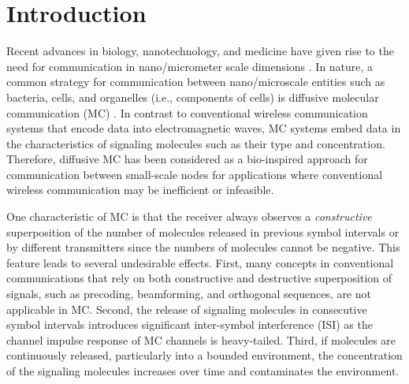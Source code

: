 \documentclass[conference]{IEEEtran}
\begin{document}



\section{Introduction}
Recent advances in biology, nanotechnology, and medicine have given rise to the need for communication in nano/micrometer scale dimensions \cite{Nariman_Survey}. In nature,  a common strategy for communication between nano/microscale entities such as bacteria, cells, and organelles (i.e., components of
cells) is diffusive molecular communication (MC) \cite{CellBio}. In contrast to conventional wireless communication systems that encode data into electromagnetic
waves, MC systems embed data in the characteristics of  signaling molecules such as their type and concentration. Therefore,
diffusive MC has been considered as a bio-inspired approach for communication between small-scale
nodes for applications where conventional wireless communication may be inefficient or infeasible.

One characteristic of MC is that the receiver always observes a \textit{constructive} superposition of the number of molecules  released in previous symbol intervals or by different transmitters since the numbers of molecules cannot be negative. This feature leads to  several undesirable effects. First, many concepts in conventional communications that rely on both constructive and destructive superposition of signals, such as precoding, beamforming, and orthogonal sequences, are not  applicable in MC. Second, the release of signaling molecules in consecutive symbol intervals introduces significant inter-symbol interference (ISI) as the channel impulse response of MC channels is heavy-tailed. Third, if molecules are continuously released, particularly into a bounded environment, the concentration of the signaling molecules increases over time and contaminates the environment. 
\end{document}
